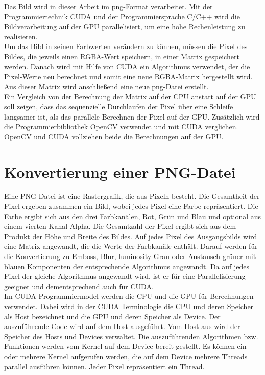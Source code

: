 \documentclass{llncs}
\begin{document}
Das Bild wird in dieser Arbeit im png-Format verarbeitet. Mit der Programmiertechnik CUDA und der Programmiersprache C/C++ wird die Bildverarbeitung auf der GPU parallelisiert, um eine hohe Rechenleistung zu realisieren.\\

Um das Bild in seinen Farbwerten verändern zu können, müssen die Pixel des Bildes, die jeweils einen RGBA-Wert speichern, in einer Matrix gespeichert werden. Danach wird mit Hilfe von CUDA ein Algorithmus verwendet, der die Pixel-Werte neu berechnet und somit eine neue RGBA-Matrix hergestellt wird. Aus dieser Matrix wird anschließend eine neue png-Datei erstellt.\\

Ein Vergleich von der Berechnung der Matrix auf der CPU anstatt auf der GPU soll zeigen, dass das sequenzielle Durchlaufen der Pixel über eine Schleife langsamer ist, als das parallele Berechnen der Pixel auf der GPU. Zusätzlich wird die Programmierbibliothek OpenCV verwendet und mit CUDA verglichen. OpenCV und CUDA vollziehen beide die Berechnungen auf der GPU.\\

%
\section{Konvertierung einer PNG-Datei}
%

Eine PNG-Datei ist eine Rastergrafik, die aus Pixeln besteht. Die Gesamtheit der Pixel ergeben zusammen ein Bild, wobei jedes Pixel eine Farbe repräsentiert. Die Farbe ergibt sich aus den drei Farbkanälen, Rot, Grün und Blau und optional aus einem vierten Kanal Alpha. Die Gesamtzahl der Pixel ergibt sich aus dem Produkt der Höhe und Breite des Bildes. Auf jedes Pixel des Ausgangsbilds wird eine Matrix angewandt, die die Werte der Farbkanäle enthält. Darauf werden für die Konvertierung zu Emboss, Blur, luminosity Grau oder Austausch grüner mit blauen Komponenten der entsprechende Algorithmus angewandt. Da auf jedes Pixel der gleiche Algorithmus angewandt wird, ist er für eine Parallelisierung geeignet und dementsprechend auch für CUDA.\\

Im CUDA Programmiermodel werden die CPU und die GPU für Berechnungen verwendet. Dabei wird in der CUDA Terminologie die CPU und deren Speicher als Host bezeichnet und die GPU und deren Speicher als Device. Der auszuführende Code wird auf dem Host ausgeführt. Vom Host aus wird der Speicher des Hosts und Devices verwaltet. Die auszuführenden Algorithmen bzw. Funktionen werden vom Kernel auf dem Device bereit gestellt. Es können ein oder mehrere Kernel aufgerufen werden, die auf dem Device mehrere Threads parallel ausführen können. Jeder Pixel repräsentiert ein Thread.\\
\end{document}
